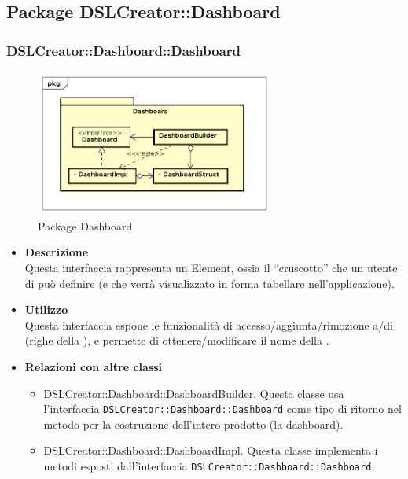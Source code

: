         \subsection{Package DSLCreator::Dashboard}
                \subsubsection{DSLCreator::Dashboard::Dashboard}
                \begin{figure}[H]
                  \centering
                  \includegraphics[width=0.7\textwidth]{res/img/Dashboard.png}
                  \caption{Package Dashboard}
                  \label{fig:diagram_model}
                \end{figure}
                    \begin{itemize}
                        \item \textbf{Descrizione} \hfill \\
                            Questa interfaccia rappresenta un  Element, ossia il ``cruscotto'' che un utente di  può definire (e che verrà visualizzato in forma tabellare nell'applicazione).
                        \item \textbf{Utilizzo}  \hfill \\
                            Questa interfaccia espone le funzionalità di accesso/aggiunta/rimozione a/di  (righe della ), e permette di ottenere/modificare il nome della .
                        \item \textbf{Relazioni con altre classi} \hfill 
                            \begin{itemize}
                              \item DSLCreator::Dashboard::DashboardBuilder. Questa classe usa l'interfaccia \texttt{DSLCreator::Dashboard::Dashboard} come tipo di ritorno nel metodo per la costruzione dell'intero prodotto (la dashboard).
                              \item DSLCreator::Dashboard::DashboardImpl. Questa classe implementa i metodi esposti dall'interfaccia \texttt{DSLCreator::Dashboard::Dashboard}.
                            \end{itemize}
                    \end{itemize}

